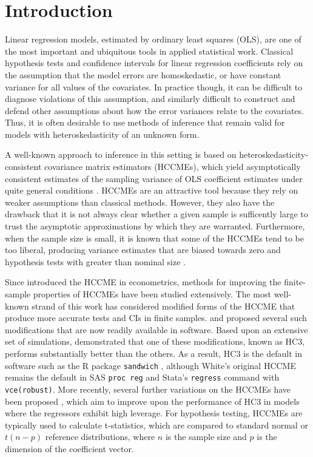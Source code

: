 \documentclass[12pt]{article}\usepackage[]{graphicx}\usepackage[]{color}
\begin{document}
\newpage
{} %

\section{Introduction}
\label{sec:intro}

Linear regression models, estimated by ordinary least squares (OLS), are one of the most important and ubiquitous tools in applied statistical work.
Classical hypothesis tests and confidence intervals for linear regression coefficients rely on the assumption that the model errors are homoskedastic, or have constant variance for all values of the covariates. 
In practice though, it can be difficult to diagnose violations of this assumption, and similarly difficult to construct and defend other assumptions about how the error variances relate to the covariates. 
Thus, it is often desirable to use methods of inference that remain valid for models with heteroskedasticity of an unknown form.

A well-known approach to inference in this setting is based on heteroskedasticity-consistent covariance matrix estimators (HCCMEs), which yield asymptotically consistent estimates of the sampling variance of OLS coefficient estimates under quite general conditions \citep{Huber1967behavior, Eicker1967limit, White1980heteroskedasticity}. 
HCCMEs are an attractive tool because they rely on weaker assumptions than classical methods. 
However, they also have the drawback that it is not always clear whether a given sample is sufficently large to trust the asymptotic approximations by which they are warranted. 
Furthermore, when the sample size is small, it is known that some of the HCCMEs tend to be too liberal, producing variance estimates that are biased towards zero and hypothesis tests with greater than nominal size \citep{Long2000using}. 

Since \citet{White1980heteroskedasticity} introduced the HCCME in econometrics, methods for improving the finite-sample properties of HCCMEs have been studied extensively.  
The most well-known strand of this work has considered modified forms of the HCCME that produce more accurate tests and CIs in finite samples. \citet{MacKinnon1985some} and \citet{Davidson1993estimation} proposed several such modifications that are now readily available in software. 
Based upon an extensive set of simulations, \citet{Long2000using} demonstrated that one of these modifications, known as HC3, performs substantially better than the others.
As a result, HC3 is the default in software such as the R package \texttt{sandwich} \citep{Zeileis2004econometric}, although White's original HCCME remains the default in SAS \texttt{proc reg} and Stata's \texttt{regress} command with \texttt{vce(robust)}. 
More recently, several further variations on the HCCMEs have been proposed \citep{Cribari-Neto2004asymptotic, Cribari-Neto2007inference, Cribari-Neto2011new}, which aim to improve upon the performance of HC3 in models where the regressors exhibit high leverage. 
For hypothesis testing, HCCMEs are typically used to calculate t-statistics, which are compared to standard normal or $t(n - p)$ reference distributions, where $n$ is the sample size and $p$ is the dimension of the coefficient vector.
\end{document}
